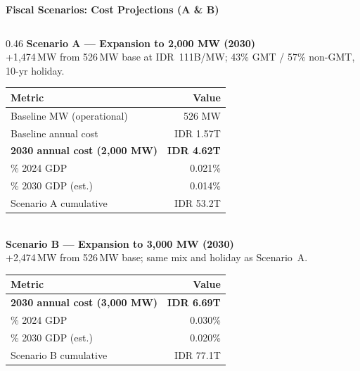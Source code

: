 \documentclass[aspectratio=169,10pt]{beamer}
\begin{document}
\begin{frame}{\textbf{Fiscal Scenarios: Cost Projections (A \& B)}}
\vspace{0.15cm}

\begin{columns}[T]
  \begin{column}{0.46\textwidth}
    {\small\color{navyblue}\textbf{Scenario A — Expansion to 2,000 MW (2030)}}\\[3pt]
    {\scriptsize +1,474\,MW from 526\,MW base at IDR~111B/MW; 43\% GMT / 57\% non-GMT, 10-yr holiday.}\\[5pt]
    {\scriptsize
    \begin{tabular}{lr}
      \toprule
      \rowcolor{navyblue}\color{white}\textbf{Metric} & \color{white}\textbf{Value} \\
      \midrule
      \rowcolor{lightgray} Baseline MW (operational) & 526 MW \\
      Baseline annual cost    & IDR 1.57T \\
      \rowcolor{lightgray} \textbf{2030 annual cost (2,000 MW)} & \textbf{IDR 4.62T} \\
      \% 2024 GDP              & 0.021\% \\
      \rowcolor{lightgray} \% 2030 GDP (est.)        & 0.014\% \\
      Scenario A cumulative   & IDR 53.2T \\
      \bottomrule
    \end{tabular}
    }\\[6pt]

    {\small\color{navyblue}\textbf{Scenario B — Expansion to 3,000 MW (2030)}}\\[3pt]
    {\scriptsize +2,474\,MW from 526\,MW base; same mix and holiday as Scenario~A.}\\[5pt]
    {\scriptsize
    \begin{tabular}{lr}
      \toprule
      \rowcolor{navyblue}\color{white}\textbf{Metric} & \color{white}\textbf{Value} \\
      \midrule
      \rowcolor{lightgray} \textbf{2030 annual cost (3,000 MW)} & \textbf{IDR 6.69T} \\
      \% 2024 GDP              & 0.030\% \\
      \rowcolor{lightgray} \% 2030 GDP (est.)        & 0.020\% \\
      Scenario B cumulative   & IDR 77.1T \\
      \bottomrule
    \end{tabular}
    }
  \end{column}


\end{columns}
\end{frame}
\end{document}
